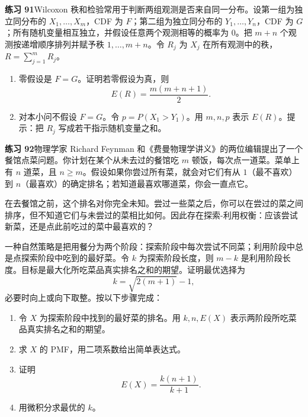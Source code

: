 \documentclass[UTF8,12pt,a4paper,fontset=fandol]{ctexart}
\begin{document}
\noindent\textbf{练习 91}\quad Wilcoxon 秩和检验常用于判断两组观测是否来自同一分布。设第一组为独立同分布的 $X_1,\ldots,X_m$，CDF 为 $F$；第二组为独立同分布的 $Y_1,\ldots,Y_n$，CDF 为 $G$；所有随机变量相互独立，并假设任意两个观测相等的概率为 $0$。把 $m+n$ 个观测按递增顺序排列并赋予秩 $1,\ldots,m+n$。令 $R_j$ 为 $X_j$ 在所有观测中的秩，$R=\sum_{j=1}^m R_j$。
\begin{enumerate}
  \item[(a)] 零假设是 $F=G$。证明若零假设为真，则
  \[
    E(R)=\frac{m(m+n+1)}{2}.
  \]
  \item[(b)] 对本小问不假设 $F=G$。令 $p=P(X_1>Y_1)$。用 $m,n,p$ 表示 $E(R)$。提示：把 $R_j$ 写成若干指示随机变量之和。
\end{enumerate}

\noindent\textbf{练习 92}\quad 物理学家 Richard Feynman 和《费曼物理学讲义》的两位编辑提出了一个餐馆点菜问题。你计划在某个从未去过的餐馆吃 $m$ 顿饭，每次点一道菜。菜单上有 $n$ 道菜，且 $n\ge m$。假设如果你尝过所有菜，就会对它们有从 $1$（最不喜欢）到 $n$（最喜欢）的确定排名；若知道最喜欢哪道菜，你会一直点它。

在去餐馆之前，这个排名对你完全未知。尝过一些菜之后，你可以在尝过的菜之间排序，但不知道它们与未尝过的菜相比如何。因此存在探索-利用权衡：应该尝试新菜，还是点此前吃过的菜中最喜欢的？

一种自然策略是把用餐分为两个阶段：探索阶段中每次尝试不同菜；利用阶段中总是点探索阶段中吃到的最好菜。令 $k$ 为探索阶段长度，则 $m-k$ 是利用阶段长度。目标是最大化所吃菜品真实排名之和的期望。证明最优选择为
\[
  k=\sqrt{2(m+1)}-1,
\]
必要时向上或向下取整。按以下步骤完成：
\begin{enumerate}
  \item[(a)] 令 $X$ 为探索阶段中找到的最好菜的排名。用 $k,n,E(X)$ 表示两阶段所吃菜品真实排名之和的期望。
  \item[(b)] 求 $X$ 的 PMF，用二项系数给出简单表达式。
  \item[(c)] 证明
  \[
    E(X)=\frac{k(n+1)}{k+1}.
  \]
  \item[(d)] 用微积分求最优的 $k$。
\end{enumerate}
\end{document}
